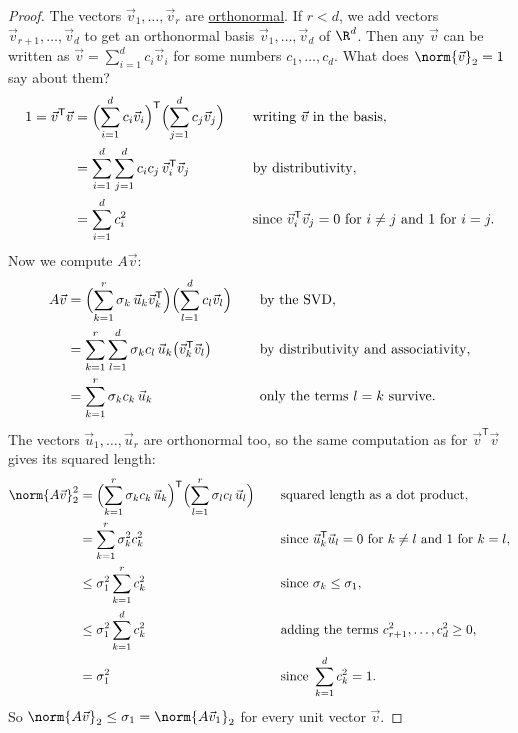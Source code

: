\documentclass[a4paper,12pt,oneside]{report}
\begin{document}
\begin{proof}
The vectors $\vec v_1,\ldots,\vec v_r$ are
\hyperref[def:orthonormal]{orthonormal}. If $r<d$, we add vectors
$\vec v_{r+1},\ldots,\vec v_d$ to get an orthonormal basis
$\vec v_1,\ldots,\vec v_d$ of $\R^d$. Then any $\vec v$ can be written
as $\vec v=\sum_{i=1}^{d}c_i\vec v_i$ for some numbers
$c_1,\ldots,c_d$. What does $\norm{\vec v}_2=1$ say about them?
\[
\begin{aligned}
  1=\vec v^{\mathsf T}\vec v
    &=\Bigl(\sum_{i=1}^{d}c_i\vec v_i\Bigr)^{\mathsf T}
      \Bigl(\sum_{j=1}^{d}c_j\vec v_j\Bigr)
      &&\quad\text{writing } \vec v \text{ in the basis},\\
    &=\sum_{i=1}^{d}\sum_{j=1}^{d}c_ic_j\,\vec v_i^{\mathsf T}\vec v_j
      &&\quad\text{by distributivity},\\
    &=\sum_{i=1}^{d}c_i^2
      &&\quad\text{since } \vec v_i^{\mathsf T}\vec v_j=0 \text{ for } i\neq j
        \text{ and } 1 \text{ for } i=j.
\end{aligned}
\]
Now we compute $A\vec v$:
\[
\begin{aligned}
  A\vec v
    &=\Bigl(\sum_{k=1}^{r}\sigma_k\,\vec u_k\vec v_k^{\mathsf T}\Bigr)
      \Bigl(\sum_{l=1}^{d}c_l\vec v_l\Bigr)
      &&\quad\text{by the SVD},\\
    &=\sum_{k=1}^{r}\sum_{l=1}^{d}\sigma_kc_l\,\vec u_k\bigl(\vec v_k^{\mathsf T}\vec v_l\bigr)
      &&\quad\text{by distributivity and associativity},\\
    &=\sum_{k=1}^{r}\sigma_kc_k\,\vec u_k
      &&\quad\text{only the terms } l=k \text{ survive}.
\end{aligned}
\]
The vectors $\vec u_1,\ldots,\vec u_r$ are orthonormal too, so the
same computation as for $\vec v^{\mathsf T}\vec v$ gives its squared
length:
\[
\begin{aligned}
  \norm{A\vec v}_2^2
    &=\Bigl(\sum_{k=1}^{r}\sigma_kc_k\,\vec u_k\Bigr)^{\mathsf T}
      \Bigl(\sum_{l=1}^{r}\sigma_lc_l\,\vec u_l\Bigr)
      &&\quad\text{squared length as a dot product},\\
    &=\sum_{k=1}^{r}\sigma_k^2c_k^2
      &&\quad\text{since } \vec u_k^{\mathsf T}\vec u_l=0 \text{ for } k\neq l
        \text{ and } 1 \text{ for } k=l,\\
    &\leq\sigma_1^2\sum_{k=1}^{r}c_k^2
      &&\quad\text{since } \sigma_k\leq\sigma_1,\\
    &\leq\sigma_1^2\sum_{k=1}^{d}c_k^2
      &&\quad\text{adding the terms } c_{r+1}^2,\ldots,c_d^2\geq0,\\
    &=\sigma_1^2
      &&\quad\text{since } \sum_{k=1}^{d}c_k^2=1 .
\end{aligned}
\]
So $\norm{A\vec v}_2\leq\sigma_1=\norm{A\vec v_1}_2$ for every unit
vector $\vec v$.
\end{proof}
\end{document}
